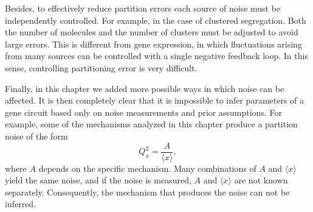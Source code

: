 Besides, to effectively reduce partition errors each source of noise must be independently controlled. For example, in the case of clustered segregation. Both the number of molecules and the number of clusters must be adjusted to avoid large errors. This is different from gene expression, in which fluctuations arising from many sources can be controlled with a single negative feedback loop. In this sense, controlling partitioning error is very difficult.

Finally, in this chapter we added more possible ways in which noise can be affected. It is then completely clear that it is impossible to infer parameters of a gene circuit based only on noise measurements and prior assumptions. For example, some of the mechanisms analyzed in this chapter produce a partition noise of the form
\begin{equation*}
  Q_x^2=\frac{A}{\langle x\rangle},
\end{equation*}
where $A$ depends on the specific mechanism. Many combinations of $A$ and $\langle x\rangle$ yield the same noise, and if the noise is measured, $A$ and $\langle x\rangle$ are not known separately. Consequently, the mechanism that produces the noise can not be inferred.
